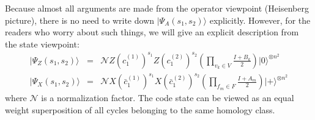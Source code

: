 Because almost all arguments are made from the operator viewpoint (Heisenberg picture), there is no need to write down $|\Psi_A(s_1,s_2) \rangle$ explicitly.
However, for the readers who worry about such things, we will give an explicit description from the state viewpoint:
\begin{eqnarray}
|\Psi _Z (s_1,s_2)\rangle &=& \mathcal{N}  Z(c_1^{(1)})^{s_1} Z(c_1^{(2)})^{s_2} \left( \prod _{v_k \in V} \frac{I+B_k}{2} \right) |0\rangle ^{\otimes n^2}
\\
|\Psi _X (s_1,s_2)\rangle &=&\mathcal{N}  X(\bar c_1^{(1)})^{s_1} X(\bar c_1^{(2)})^{s_2}\left( \prod _{f_m \in F} \frac{I+A_m}{2} \right) |+\rangle ^{\otimes n^2}
\end{eqnarray}
where $\mathcal{N}$ is a normalization factor.
The code state can be viewed as an equal weight superposition of all cycles belonging to the same homology class.

